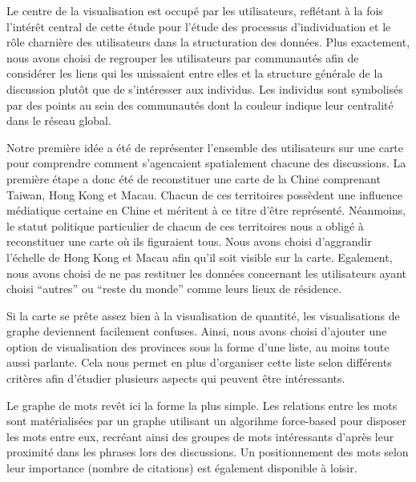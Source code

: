 Le centre de la visualisation est occup\'e par les utilisateurs,
refl\'etant \`a la fois l{\textquoteright}int\'er\^et central de cette
\'etude pour l{\textquoteright}\'etude des processus
d{\textquoteright}individuation et le r\^ole charni\`ere des
utilisateurs dans la structuration des donn\'ees. Plus exactement, nous
avons choisi de regrouper les utilisateurs par communaut\'es afin de
consid\'erer les liens qui les unissaient entre elles et la structure
g\'en\'erale de la discussion plut\^ot que de
s{\textquoteright}int\'eresser aux individus. Les individus sont
symbolis\'es par des points au sein des communaut\'es dont la couleur
indique leur centralit\'e dans le r\'eseau global. 

Notre premi\`ere id\'ee a \'et\'e de repr\'esenter
l{\textquoteright}ensemble des utilisateurs sur une carte pour
comprendre comment s{\textquoteright}agencaient spatialement chacune
des discussions. La premi\`ere \'etape a donc \'et\'e de reconstituer
une carte de la Chine comprenant Taiwan, Hong Kong et Macau. Chacun de
ces territoires poss\`edent une influence m\'ediatique certaine en
Chine et m\'eritent \`a ce titre d{\textquoteright}\^etre
repr\'esent\'e. N\'eanmoins, le statut politique particulier de chacun
de ces territoires nous a oblig\'e \`a reconstituer une carte o\`u ils
figuraient tous. Nous avons choisi d{\textquoteright}aggrandir
l{\textquoteright}\'echelle de Hong Kong et Macau afin
qu{\textquoteright}il soit visible sur la carte. Egalement, nous avons
choisi de ne pas restituer les donn\'ees concernant les utilisateurs
ayant choisi {\textquotedblleft}autres{\textquotedblright} ou
{\textquotedblleft}reste du monde{\textquotedblright} comme leurs lieux
de r\'esidence.

Si la carte se pr\^ete assez bien \`a la visualisation de quantit\'e,
les visualisations de graphe deviennent facilement confuses. Ainsi,
nous avons choisi d{\textquoteright}ajouter une option de visualisation
des provinces sous la forme d{\textquoteright}une liste, au moins toute
aussi parlante. Cela nous permet en plus d{\textquoteright}organiser
cette liste selon diff\'erents crit\`eres afin
d{\textquoteright}\'etudier plusieurs aspects qui peuvent \^etre
int\'eressants.

Le graphe de mots rev\^et ici la forme la plus simple. Les relations
entre les mots sont mat\'erialis\'ees par un graphe utilisant un
algorihme force-based pour disposer les mots entre eux, recr\'eant
ainsi des groupes de mots int\'eressants d{\textquoteright}apr\`es leur
proximit\'e dans les phrases lors des discussions. Un positionnement
des mots selon leur importance (nombre de citations) est \'egalement
disponible \`a loisir.

